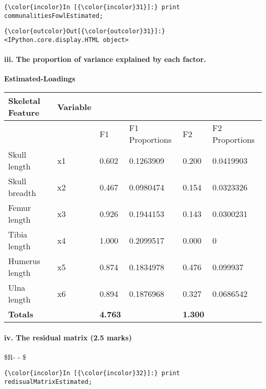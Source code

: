 \documentclass[11pt]{article}
\begin{document}
    \begin{Verbatim}[commandchars=\\\{\}]
{\color{incolor}In [{\color{incolor}31}]:} print communalitiesFowlEstimated;
\end{Verbatim}


\begin{Verbatim}[commandchars=\\\{\}]
{\color{outcolor}Out[{\color{outcolor}31}]:} <IPython.core.display.HTML object>
\end{Verbatim}
            
    \hypertarget{iii.-the-proportion-of-variance-explained-by-each-factor.}{%
\paragraph{iii. The proportion of variance explained by each
factor.}\label{iii.-the-proportion-of-variance-explained-by-each-factor.}}

    \textbf{Estimated-Loadings}

\begin{longtable}[]{@{}llllll@{}}
\toprule
Skeletal Feature & Variable & & & &\tabularnewline
\midrule
\endhead
& & F1 & F1 Proportions & F2 & F2 Proportions\tabularnewline
Skull length & x1 & 0.602 & 0.1263909 & 0.200 & 0.0419903\tabularnewline
Skull breadth & x2 & 0.467 & 0.0980474 & 0.154 &
0.0323326\tabularnewline
Femur length & x3 & 0.926 & 0.1944153 & 0.143 & 0.0300231\tabularnewline
Tibia length & x4 & 1.000 & 0.2099517 & 0.000 & 0\tabularnewline
Humerus length & x5 & 0.874 & 0.1834978 & 0.476 &
0.099937\tabularnewline
Ulna length & x6 & 0.894 & 0.1876968 & 0.327 & 0.0686542\tabularnewline
\textbf{Totals} & & \textbf{4.763} & & \textbf{1.300} &\tabularnewline
\bottomrule
\end{longtable}

    \hypertarget{iv.-the-residual-matrix-2.5-marks}{%
\paragraph{iv. The residual matrix (2.5
marks)}\label{iv.-the-residual-matrix-2.5-marks}}

    \$R-  -\hat { \psi  } \$

    \begin{Verbatim}[commandchars=\\\{\}]
{\color{incolor}In [{\color{incolor}32}]:} print redisualMatrixEstimated;
\end{Verbatim}
\end{document}

